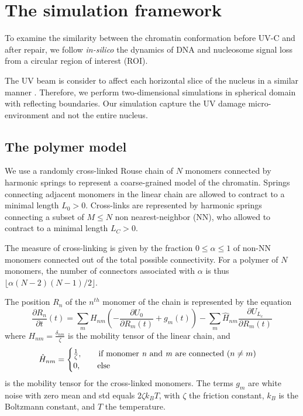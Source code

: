 \documentclass[12pt]{article}
\begin{document}
\section{The simulation framework}
	To examine the similarity between the chromatin conformation before UV-C and after repair, we follow \textit{in-silico} the dynamics of DNA and nucleosome signal loss from a circular region of interest (ROI).
	
	The UV beam is consider to affect each horizontal slice of the nucleus in a similar manner \cite{adam2015imaging}. Therefore, we perform two-dimensional simulations in spherical domain with reflecting boundaries. Our simulation capture the UV damage micro-environment and not the entire nucleus. 
	
	\subsection{The polymer model}
	We use a randomly cross-linked Rouse chain of $N$ monomers connected by harmonic springs \cite{doi1988theory} to represent a coarse-grained model of the chromatin. Springs connecting adjacent monomers in the linear chain are allowed to contract to a minimal length $L_0>0$. Cross-links are represented by harmonic springs connecting a subset of $M\leq N$ non nearest-neighbor (NN), who allowed to contract to a minimal length $L_C>0$.  
	
	The measure of cross-linking is given by the fraction $0\leq \alpha\leq 1$ of non-NN monomers connected out of the total possible connectivity. For a polymer of $N$ monomers, the number of connectors associated with $\alpha$ is thus 
	$\lfloor\alpha(N-2)(N-1)/2\rfloor$.
		
	The position $R_n$ of the $n^{th}$ monomer of the chain is represented by the equation 
	\begin{equation}
	\frac{\partial R_n}{\partial t}(t) = \sum_m H_{nm}\left(-\frac{\partial U_0}{\partial R_m(t)}+g_m(t)\right) -\sum_m \hat{H}_{nm}\frac{\partial U_{L_c}}{\partial R_m (t)}
	\end{equation}
	where $H_{nm}=\frac{\delta_{nm}}{\zeta}$ is the mobility tensor of the linear chain, and 	
	\begin{equation}
	\hat{H}_{nm}= \begin{cases}
	\frac{1}{\zeta},\qquad 
	\text{if monomer \textit{n} and \textit{m} are connected ($n\neq m$)}\\
	0,\qquad \text{else}
	\end{cases}
	\end{equation}
	is the mobility tensor for the cross-linked monomers. 
	The terms $g_m$ are white noise with zero mean and std equals $2\zeta k_BT$, with $\zeta$ the friction constant, $k_B$ is the Boltzmann constant, and $T$ the temperature.  
	
\end{document}
